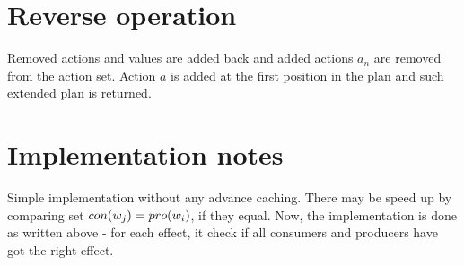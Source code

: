 	
	\section{Reverse operation}
	Removed actions and values are added back and added actions $a_n$ are removed from the action set. Action $a$ is added at the first position in the plan and such extended plan is returned.
	
	\section{Implementation notes}
	Simple implementation without any advance caching. There may be speed up by comparing set $con(w_j) = pro(w_i)$, if they equal. Now, the implementation is done as written above - for each effect, it check if all consumers and producers have got the right effect.
	
	
	